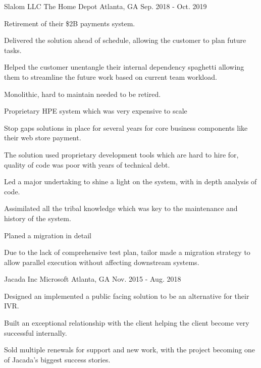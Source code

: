 \begin{cventries}
\cventry
{Slalom LLC} %
{The Home Depot} %
{Atlanta, GA} %
{Sep. 2018 - Oct. 2019} %
{
  \begin{cvitems} %
    \item {Retirement of their \$2B payments system.}
    \item {Delivered the solution ahead of schedule, allowing the customer to plan future tasks.}
    \item {Helped the customer unentangle their internal dependency spaghetti allowing them to streamline the future work based on current team workload.}
    \item {Monolithic, hard to maintain needed to be retired.}
    \item {Proprietary HPE system which was very expensive to scale}
    \item {Stop gaps solutions in place for several years for core business components like their web store payment.}
    \item {The solution used proprietary development tools which are hard to hire for, quality of code was poor with years of technical debt.}
    \item {Led a major undertaking to shine a light on the system, with in depth analysis of code.}
    \item {Assimilated all the tribal knowledge which was key to the maintenance and history of the system.}
    \item {Planed a migration in detail} 
    \item {Due to the lack of comprehensive test plan, tailor made a migration strategy to allow parallel execution without affecting downstream systems.}
  \end{cvitems}
}
\cventry
{Jacada Inc} %
{Microsoft} %
{Atlanta, GA} %
{Nov. 2015 - Aug. 2018} %
{
  \begin{cvitems} %
    \item {Designed an implemented a public facing solution to be an alternative for their IVR.}
    \item {Built an exceptional relationship with the client helping the client become very successful internally.}
    \item {Sold multiple renewals for support and new work, with the project becoming one of Jacada’s biggest success stories.}

\end{cvitems}}
\end{cventries}
